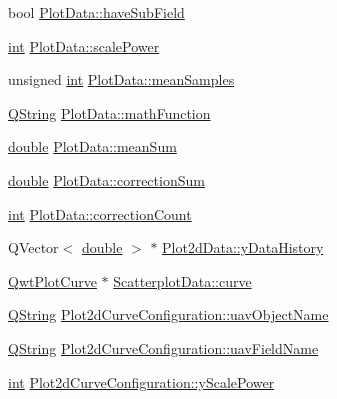 \begin{DoxyCompactItemize}
\item 
bool \hyperlink{group___scope_plugin_ga75814d7f770a1a8348f39dc7ca4bdb8f}{Plot\-Data\-::have\-Sub\-Field}
\item 
\hyperlink{ioapi_8h_a787fa3cf048117ba7123753c1e74fcd6}{int} \hyperlink{group___scope_plugin_gad4b115ab449c4276ef15d3e2862e6280}{Plot\-Data\-::scale\-Power}
\item 
unsigned \hyperlink{ioapi_8h_a787fa3cf048117ba7123753c1e74fcd6}{int} \hyperlink{group___scope_plugin_ga577111acdda17558321da13bff25a7c0}{Plot\-Data\-::mean\-Samples}
\item 
\hyperlink{group___u_a_v_objects_plugin_gab9d252f49c333c94a72f97ce3105a32d}{Q\-String} \hyperlink{group___scope_plugin_gaa8ea6880a7faa36947144d2df62d6642}{Plot\-Data\-::math\-Function}
\item 
\hyperlink{_super_l_u_support_8h_a8956b2b9f49bf918deed98379d159ca7}{double} \hyperlink{group___scope_plugin_ga619dc668a50f1123f71de7baa4dc5f9c}{Plot\-Data\-::mean\-Sum}
\item 
\hyperlink{_super_l_u_support_8h_a8956b2b9f49bf918deed98379d159ca7}{double} \hyperlink{group___scope_plugin_ga802021e218f3dadce03011cdeea7d90b}{Plot\-Data\-::correction\-Sum}
\item 
\hyperlink{ioapi_8h_a787fa3cf048117ba7123753c1e74fcd6}{int} \hyperlink{group___scope_plugin_ga85cd1767be2be06460ecbbd11b9ec366}{Plot\-Data\-::correction\-Count}
\item 
Q\-Vector$<$ \hyperlink{_super_l_u_support_8h_a8956b2b9f49bf918deed98379d159ca7}{double} $>$ $\ast$ \hyperlink{group___scope_plugin_ga3f05450290135f9d3b69ab0119718f11}{Plot2d\-Data\-::y\-Data\-History}
\item 
\hyperlink{class_qwt_plot_curve}{Qwt\-Plot\-Curve} $\ast$ \hyperlink{group___scope_plugin_ga4a0647f875271067323cf2ad3868afa4}{Scatterplot\-Data\-::curve}
\item 
\hyperlink{group___u_a_v_objects_plugin_gab9d252f49c333c94a72f97ce3105a32d}{Q\-String} \hyperlink{group___scope_plugin_gaf7c7f2da1da17096fbffa1fdaa35d30e}{Plot2d\-Curve\-Configuration\-::uav\-Object\-Name}
\item 
\hyperlink{group___u_a_v_objects_plugin_gab9d252f49c333c94a72f97ce3105a32d}{Q\-String} \hyperlink{group___scope_plugin_ga5f9e57253d839d8b0094e4360f61155f}{Plot2d\-Curve\-Configuration\-::uav\-Field\-Name}
\item 
\hyperlink{ioapi_8h_a787fa3cf048117ba7123753c1e74fcd6}{int} \hyperlink{group___scope_plugin_ga42557670a9e1e7f792d3ecb795387425}{Plot2d\-Curve\-Configuration\-::y\-Scale\-Power}

\end{DoxyCompactItemize}
